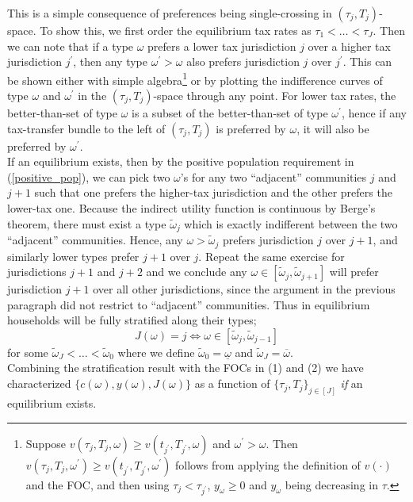 \documentclass[fleqn,10pt]{olplainarticle}
\begin{document}
This is a simple consequence of preferences being single-crossing in $(\tau_j, T_j)$-space. To show this, we first order the equilibrium tax rates as $\tau_1 < \ldots < \tau_J$. Then we can note that if a type $\omega$ prefers a lower tax jurisdiction $j$ over  a higher tax jurisdiction $j^\prime$, then any type $\omega^\prime > \omega$ also prefers jurisdiction $j$ over $j^\prime$. This can be shown either with simple algebra\footnote{Suppose $v(\tau_j, T_j, \omega) \geq v(t_{j^\prime}, T_{j^\prime}, \omega)$ and $\omega^\prime > \omega$. Then $v(\tau_j, T_j, \omega^\prime) \geq v(t_{j^\prime}, T_{j^\prime}, \omega^\prime)$ follows from applying the definition of $v\left(\cdot\right)$ and the FOC, and then using $\tau_j < \tau_{j^\prime}$,  $y_\omega \geq 0$ and $y_\omega$ being decreasing in $\tau$.} or by plotting the indifference curves of type $\omega$ and $\omega^\prime$ in the $(\tau_j, T_j)$-space through any point. For lower tax rates, the better-than-set of type $\omega$ is a subset of the better-than-set of type $\omega^\prime$, hence if any tax-transfer bundle to the left of $(\tau_j, T_j)$ is preferred by $\omega$, it will also be preferred by $\omega^\prime$.\\

If an equilibrium exists, then by the positive population requirement in (\ref{positive_pop}), we can pick two $\omega$'s for any two ``adjacent'' communities $j$ and $j+1$ such that one prefers the higher-tax jurisdiction and the other prefers the lower-tax one. Because the indirect utility function is continuous by Berge's theorem, there must exist a type $\tilde\omega_j$ which is exactly indifferent between the two ``adjacent'' communities. Hence, any $\omega > \tilde\omega_j$ prefers jurisdiction $j$ over $j+1$, and similarly lower types prefer $j+1$ over $j$. Repeat the same exercise for jurisdictions $j+1$ and $j+2$ and we conclude any $\omega \in \left[\tilde\omega_j, \tilde\omega_{j+1}\right]$ will prefer jurisdiction $j+1$ over all other jurisdictions, since the argument in the previous paragraph did not restrict to ``adjacent'' communities. Thus in equilibrium households will be fully stratified along their types; $$J(\omega) = j \iff \omega \in \left[\tilde\omega_j, \tilde\omega_{j-1}\right]$$
for some $\tilde\omega_J < \ldots < \tilde\omega_0$ where we define $\tilde\omega_0 = \underline{\omega}$ and $\tilde\omega_{J} = \overline{\omega}$.\\

Combining the stratification result with the FOCs in (1) and (2) we have characterized $\{c(\omega), y(\omega), J(\omega)\}$ as a function of $\{\tau_j, T_j\}_{j\in \left[J\right]}$ \textit{if} an equilibrium exists. 
\end{document}
